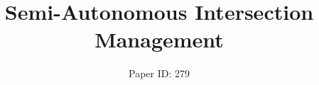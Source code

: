 \documentclass{aamas2014}
\begin{document}


\title{Semi-Autonomous Intersection Management}


\author{
%
\alignauthor
Paper ID: 279
}
\end{document}
